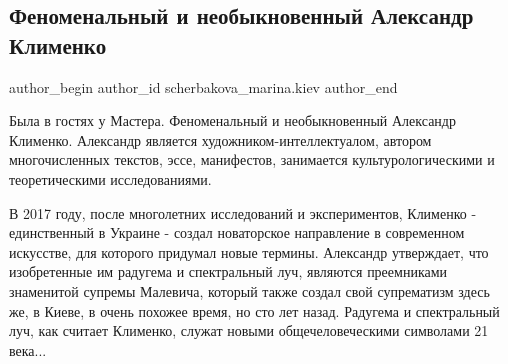  
 
 
 
 
 
\subsection{Феноменальный и необыкновенный Александр Клименко}
\label{sec:08_07_2018.fb.scherbakova_marina.kiev.1.master_aleksandr_klimenko}
 
\ifcmt
 author_begin
   author_id scherbakova_marina.kiev
 author_end
\fi

Была в гостях у Мастера. Феноменальный и необыкновенный Александр Клименко.
Александр является художником-интеллектуалом, автором многочисленных текстов,
эссе, манифестов, занимается культурологическими и теоретическими
исследованиями.


В 2017 году, после многолетних исследований и экспериментов, Клименко -
единственный в Украине - создал  новаторское направление в современном
искусстве, для которого придумал новые термины.  Александр утверждает, что
изобретенные им радугема и спектральный луч,  являются преемниками знаменитой
супремы Малевича, который также создал свой супрематизм здесь же, в Киеве, в
очень похожее время, но сто лет назад. Радугема и спектральный луч, как
считает Клименко, служат новыми общечеловеческими символами 21 века...

